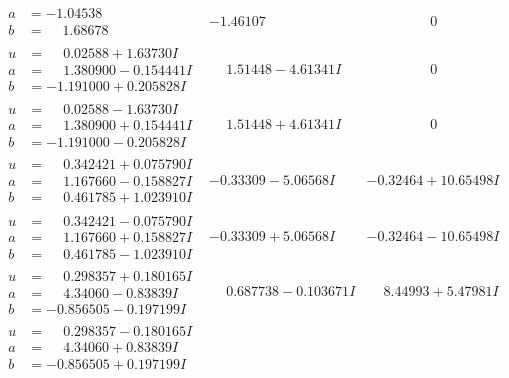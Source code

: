 \documentclass[1p]{elsarticle_modified}
\theoremstyle{definition}
\begin{document}
$$\begin{array}{c|c|c}
\begin{aligned}
a &= -1.04538\phantom{ +0.000000I} \\
b &= \phantom{-}1.68678\phantom{ +0.000000I}\end{aligned}
 & -1.46107\phantom{ +0.000000I} & \phantom{-0.000000 } 0 \\ \hline\begin{aligned}
u &= \phantom{-}0.02588 + 1.63730 I \\
a &= \phantom{-}1.380900 - 0.154441 I \\
b &= -1.191000 + 0.205828 I\end{aligned}
 & \phantom{-}1.51448 - 4.61341 I & \phantom{-0.000000 } 0 \\ \hline\begin{aligned}
u &= \phantom{-}0.02588 - 1.63730 I \\
a &= \phantom{-}1.380900 + 0.154441 I \\
b &= -1.191000 - 0.205828 I\end{aligned}
 & \phantom{-}1.51448 + 4.61341 I & \phantom{-0.000000 } 0 \\ \hline\begin{aligned}
u &= \phantom{-}0.342421 + 0.075790 I \\
a &= \phantom{-}1.167660 - 0.158827 I \\
b &= \phantom{-}0.461785 + 1.023910 I\end{aligned}
 & -0.33309 - 5.06568 I & -0.32464 + 10.65498 I \\ \hline\begin{aligned}
u &= \phantom{-}0.342421 - 0.075790 I \\
a &= \phantom{-}1.167660 + 0.158827 I \\
b &= \phantom{-}0.461785 - 1.023910 I\end{aligned}
 & -0.33309 + 5.06568 I & -0.32464 - 10.65498 I \\ \hline\begin{aligned}
u &= \phantom{-}0.298357 + 0.180165 I \\
a &= \phantom{-}4.34060 - 0.83839 I \\
b &= -0.856505 - 0.197199 I\end{aligned}
 & \phantom{-}0.687738 - 0.103671 I & \phantom{-}8.44993 + 5.47981 I \\ \hline\begin{aligned}
u &= \phantom{-}0.298357 - 0.180165 I \\
a &= \phantom{-}4.34060 + 0.83839 I \\
b &= -0.856505 + 0.197199 I\end{aligned}

\end{array}$$
\end{document}
